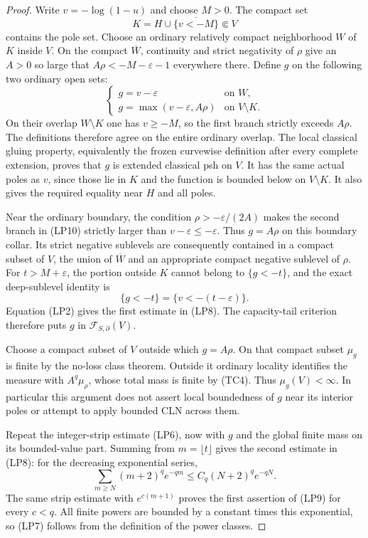 \documentclass[11pt,a4paper]{article}
\numberwithin{equation}{section}
\theoremstyle{definition}
\theoremstyle{remark}
\begin{document}
\begin{proof}
Write $v=-\log(1-u)$ and choose $M>0$. The compact set
\[
                      K=H\cup\overline{\{v<-M\}}
                              \Subset V
\]
contains the pole set. Choose an ordinary relatively compact
neighborhood $W$ of $K$ inside $V$. On the compact
$\overline W$, continuity and strict negativity of $\rho$
give an $A>0$ so large that
$A\rho<-M-\varepsilon-1$ everywhere there.
Define $g$ on the following two ordinary open sets:
\[
 \begin{cases}
 g=v-\varepsilon&\text{on }W,\\
 g=\max(v-\varepsilon,A\rho)&\text{on }V\setminus K.
 \end{cases}
 \tag{LP10}
\]
On their overlap $W\setminus K$ one has $v\geq-M$,
so the first branch strictly exceeds $A\rho$.
The definitions therefore agree on the entire ordinary overlap.
The local classical gluing property, equivalently the frozen
curvewise definition after every complete extension, proves
that $g$ is extended classical psh on $V$.
It has the same actual poles as $v$, since those lie in $K$
and the function is bounded below on $V\setminus K$.
It also gives the required equality near $H$ and all poles.

Near the ordinary boundary, the condition
$\rho>-\varepsilon/(2A)$ makes the second branch in (LP10)
strictly larger than $v-\varepsilon\leq-\varepsilon$.
Thus $g=A\rho$ on this boundary collar. Its strict negative
sublevels are consequently contained in a compact subset of
$V$, the union of $\overline W$ and an appropriate compact
negative sublevel of $\rho$.
For $t>M+\varepsilon$, the portion outside $K$ cannot belong
to $\{g<-t\}$, and the exact deep-sublevel identity is
\[
                    \{g<-t\}=\{v<-(t-\varepsilon)\}.
 \tag{LP11}
\]
Equation (LP2) gives the first estimate in (LP8).
The capacity-tail criterion therefore puts $g$ in
$\mathcal F_{S,\partial}(V)$.

Choose a compact subset of $V$ outside which $g=A\rho$.
On that compact subset $\mu_g$ is finite by the no-loss
class theorem. Outside it ordinary locality identifies the
measure with $A^q\mu_\rho$, whose total mass is finite by
(TC4). Thus $\mu_g(V)<\infty$.
In particular this argument does not assert local boundedness
of $g$ near its interior poles or attempt to apply bounded
CLN across them.

Repeat the integer-strip estimate (LP6), now with $g$ and
the global finite mass on its bounded-value part. Summing
from $m=\lfloor t\rfloor$ gives the second estimate in
(LP8): for the decreasing exponential series,
\[
 \sum_{m\geq N}(m+2)^q e^{-qm}
                         \leq C_q(N+2)^q e^{-qN}.
\]
The same strip estimate with $e^{c(m+1)}$ proves the first
assertion of (LP9) for every $c<q$. All finite powers are
bounded by a constant times this exponential, so (LP7)
follows from the definition of the power classes.


\end{proof}
\end{document}
